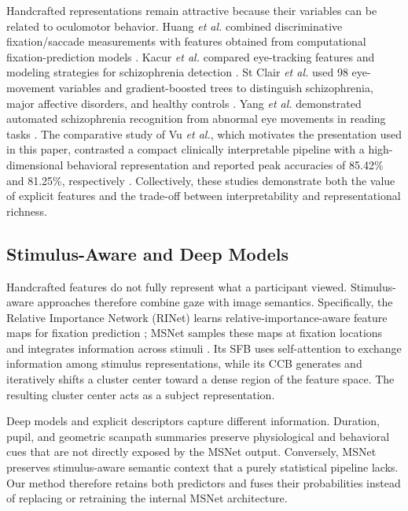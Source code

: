 \documentclass[conference,a4paper]{IEEEtran}
\begin{document}
Handcrafted representations remain attractive because their variables can be related to oculomotor behavior. Huang \emph{et al.} combined discriminative fixation/saccade measurements with features obtained from computational fixation-prediction models \cite{huang2020effective}. Kacur \emph{et al.} compared eye-tracking features and modeling strategies for schizophrenia detection \cite{kacur2020analysis}. St Clair \emph{et al.} used 98 eye-movement variables and gradient-boosted trees to distinguish schizophrenia, major affective disorders, and healthy controls \cite{stclair2022patterns}. Yang \emph{et al.} demonstrated automated schizophrenia recognition from abnormal eye movements in reading tasks \cite{yang2024automatic}. The comparative study of Vu \emph{et al.}, which motivates the presentation used in this paper, contrasted a compact clinically interpretable pipeline with a high-dimensional behavioral representation and reported peak accuracies of 85.42\% and 81.25\%, respectively \cite{vu2026comparative}. Collectively, these studies demonstrate both the value of explicit features and the trade-off between interpretability and representational richness.

\subsection{Stimulus-Aware and Deep Models}
Handcrafted features do not fully represent what a participant viewed. Stimulus-aware approaches therefore combine gaze with image semantics. Specifically, the Relative Importance Network (RINet) learns relative-importance-aware feature maps for fixation prediction \cite{song2023rinet}; MSNet samples these maps at fixation locations and integrates information across stimuli \cite{song2024ems}. Its SFB uses self-attention to exchange information among stimulus representations, while its CCB generates and iteratively shifts a cluster center toward a dense region of the feature space. The resulting cluster center acts as a subject representation.

Deep models and explicit descriptors capture different information. Duration, pupil, and geometric scanpath summaries preserve physiological and behavioral cues that are not directly exposed by the MSNet output. Conversely, MSNet preserves stimulus-aware semantic context that a purely statistical pipeline lacks. Our method therefore retains both predictors and fuses their probabilities instead of replacing or retraining the internal MSNet architecture.
\end{document}
